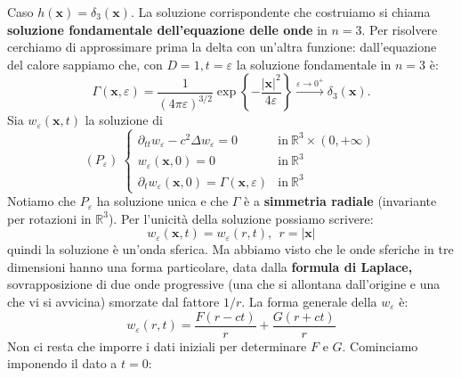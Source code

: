 \documentclass[10pt,a4paper,twoside,openright]{book}
\begin{document}
Caso $\displaystyle h(\mathbf{x}) =\delta _{3}(\mathbf{x})$. La soluzione corrispondente che costruiamo si chiama \textbf{soluzione fondamentale dell'equazione delle onde} in $\displaystyle n=3$. Per risolvere cerchiamo di approssimare prima la delta con un'altra funzione: dall'equazione del calore sappiamo che, con $\displaystyle D=1,t=\varepsilon $ la soluzione fondamentale in $\displaystyle n=3$ è:
\begin{equation*}
	\Gamma (\mathbf{x} ,\varepsilon ) =\frac{1}{( 4\pi \varepsilon )^{3/2}}\exp\left\{-\frac{| \mathbf{x}| ^{2}}{4\varepsilon }\right\}\xrightarrow{\varepsilon \rightarrow 0^{+}} \delta _{3}(\mathbf{x}) .
\end{equation*}
Sia $\displaystyle w_{\varepsilon }(\mathbf{x} ,t)$ la soluzione di
\begin{equation*}
	( P_{\varepsilon }) \ 
	\begin{cases}
		\partial _{tt} w_{\varepsilon } -c^{2} \Delta w_{\varepsilon } =0                & \text{in} \ \mathbb{R}^{3} \times ( 0,+\infty ) \\
		w_{\varepsilon }(\mathbf{x} ,0) =0                                               & \text{in} \ \mathbb{R}^{3}                      \\
		\partial _{t} w_{\varepsilon }(\mathbf{x} ,0) =\Gamma (\mathbf{x} ,\varepsilon ) & \text{in} \ \mathbb{R}^{3}                      
	\end{cases}
\end{equation*}
Notiamo che $\displaystyle P_{\varepsilon }$ ha soluzione unica e che $\displaystyle \Gamma $ è a \textbf{simmetria radiale} (invariante per rotazioni in $\displaystyle \mathbb{R}^{3}$). Per l'unicità della soluzione possiamo scrivere:
\begin{equation*}
	w_{\varepsilon }(\mathbf{x} ,t) =w_{\varepsilon }( r,t) ,\ \ r=| \mathbf{x}| 
\end{equation*}
quindi la soluzione è un'onda sferica. Ma abbiamo visto che le onde sferiche in tre dimensioni hanno una forma particolare, data dalla \textbf{formula di Laplace, }sovrapposizione di due onde progressive (una che si allontana dall'origine e una che vi si avvicina) smorzate dal fattore $\displaystyle 1/r$. La forma generale della $\displaystyle w_{\varepsilon }$ è:
\begin{equation*}
	w_{\varepsilon }( r,t) =\frac{F( r-ct)}{r} +\frac{G( r+ct)}{r}
\end{equation*}
Non ci resta che imporre i dati iniziali per determinare $\displaystyle F$ e $\displaystyle G$. Cominciamo imponendo il dato a $\displaystyle t=0$:
\end{document}
